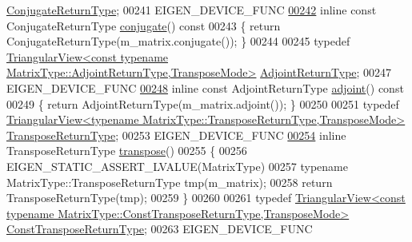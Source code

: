 \begin{DoxyCode}
       \hyperlink{group___core___module_class_eigen_1_1_triangular_view}{ConjugateReturnType};
00241     EIGEN\_DEVICE\_FUNC
\hyperlink{group___core___module_ae89c798826157831a2b1142d57f04405}{00242}     \textcolor{keyword}{inline} \textcolor{keyword}{const} ConjugateReturnType \hyperlink{group___core___module_ae89c798826157831a2b1142d57f04405}{conjugate}()\textcolor{keyword}{ const}
00243 \textcolor{keyword}{    }\{ \textcolor{keywordflow}{return} ConjugateReturnType(m\_matrix.conjugate()); \}
00244 
00245     \textcolor{keyword}{typedef} 
      \hyperlink{group___core___module_class_eigen_1_1_triangular_view}{TriangularView<const typename MatrixType::AdjointReturnType,TransposeMode>}
       \hyperlink{group___core___module_class_eigen_1_1_triangular_view}{AdjointReturnType};
00247     EIGEN\_DEVICE\_FUNC
\hyperlink{group___core___module_ab36cd4a400b5a9944b87780ebd3bec43}{00248}     \textcolor{keyword}{inline} \textcolor{keyword}{const} AdjointReturnType \hyperlink{group___core___module_ab36cd4a400b5a9944b87780ebd3bec43}{adjoint}()\textcolor{keyword}{ const}
00249 \textcolor{keyword}{    }\{ \textcolor{keywordflow}{return} AdjointReturnType(m\_matrix.adjoint()); \}
00250 
00251     \textcolor{keyword}{typedef} 
      \hyperlink{group___core___module_class_eigen_1_1_triangular_view}{TriangularView<typename MatrixType::TransposeReturnType,TransposeMode>}
       \hyperlink{group___core___module_class_eigen_1_1_triangular_view}{TransposeReturnType};
00253     EIGEN\_DEVICE\_FUNC
\hyperlink{group___core___module_a5336b45208d7e351aba7536aef153075}{00254}     \textcolor{keyword}{inline} TransposeReturnType \hyperlink{group___core___module_a5336b45208d7e351aba7536aef153075}{transpose}()
00255     \{
00256       EIGEN\_STATIC\_ASSERT\_LVALUE(MatrixType)
00257       \textcolor{keyword}{typename} MatrixType::TransposeReturnType tmp(m\_matrix);
00258       \textcolor{keywordflow}{return} TransposeReturnType(tmp);
00259     \}
00260     
00261     \textcolor{keyword}{typedef} 
      \hyperlink{group___core___module_class_eigen_1_1_triangular_view}{TriangularView<const typename MatrixType::ConstTransposeReturnType,TransposeMode>}
       \hyperlink{group___core___module_class_eigen_1_1_triangular_view}{ConstTransposeReturnType};
00263     EIGEN\_DEVICE\_FUNC

\end{DoxyCode}
